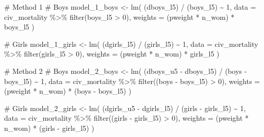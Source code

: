 \documentclass[
  letterpaper,
  DIV=11,
  numbers=noendperiod]{scrartcl}
\newenvironment{Shaded}{\begin{snugshade}}{\end{snugshade}}
\newcommand{\AttributeTok}[1]{\textcolor[rgb]{0.40,0.45,0.13}{#1}}
\newcommand{\CommentTok}[1]{\textcolor[rgb]{0.37,0.37,0.37}{#1}}
\newcommand{\DecValTok}[1]{\textcolor[rgb]{0.68,0.00,0.00}{#1}}
\newcommand{\FunctionTok}[1]{\textcolor[rgb]{0.28,0.35,0.67}{#1}}
\newcommand{\NormalTok}[1]{\textcolor[rgb]{0.00,0.23,0.31}{#1}}
\newcommand{\OtherTok}[1]{\textcolor[rgb]{0.00,0.23,0.31}{#1}}
\newcommand{\SpecialCharTok}[1]{\textcolor[rgb]{0.37,0.37,0.37}{#1}}
\begin{document}
\begin{Shaded}
\begin{Highlighting}[]
\CommentTok{\# Method 1}
\CommentTok{\# Boys}
\NormalTok{model\_1\_boys }\OtherTok{\textless{}{-}} \FunctionTok{lm}\NormalTok{(}
\NormalTok{  (dboys\_l5) }\SpecialCharTok{/}\NormalTok{ (boys\_l5) }\SpecialCharTok{\textasciitilde{}} \DecValTok{1}\NormalTok{, }
  \AttributeTok{data =}\NormalTok{ civ\_mortality }\SpecialCharTok{\%\textgreater{}\%} \FunctionTok{filter}\NormalTok{(boys\_l5 }\SpecialCharTok{\textgreater{}} \DecValTok{0}\NormalTok{), }
  \AttributeTok{weights =}\NormalTok{ (pweight }\SpecialCharTok{*}\NormalTok{ n\_wom) }\SpecialCharTok{*}\NormalTok{ boys\_l5}
\NormalTok{)}

\CommentTok{\# Girls}
\NormalTok{model\_1\_girls }\OtherTok{\textless{}{-}} \FunctionTok{lm}\NormalTok{(}
\NormalTok{  (dgirls\_l5) }\SpecialCharTok{/}\NormalTok{ (girls\_l5) }\SpecialCharTok{\textasciitilde{}} \DecValTok{1}\NormalTok{, }
  \AttributeTok{data =}\NormalTok{ civ\_mortality }\SpecialCharTok{\%\textgreater{}\%} \FunctionTok{filter}\NormalTok{(girls\_l5 }\SpecialCharTok{\textgreater{}} \DecValTok{0}\NormalTok{), }
  \AttributeTok{weights =}\NormalTok{ (pweight }\SpecialCharTok{*}\NormalTok{ n\_wom) }\SpecialCharTok{*}\NormalTok{ girls\_l5}
\NormalTok{)}

\CommentTok{\# Method 2}
\CommentTok{\# Boys}
\NormalTok{model\_2\_boys }\OtherTok{\textless{}{-}} \FunctionTok{lm}\NormalTok{(}
\NormalTok{  (dboys\_u5 }\SpecialCharTok{{-}}\NormalTok{ dboys\_l5) }\SpecialCharTok{/}\NormalTok{ (boys }\SpecialCharTok{{-}}\NormalTok{ boys\_l5) }\SpecialCharTok{\textasciitilde{}} \DecValTok{1}\NormalTok{, }
  \AttributeTok{data =}\NormalTok{ civ\_mortality }\SpecialCharTok{\%\textgreater{}\%} \FunctionTok{filter}\NormalTok{((boys }\SpecialCharTok{{-}}\NormalTok{ boys\_l5) }\SpecialCharTok{\textgreater{}} \DecValTok{0}\NormalTok{), }
  \AttributeTok{weights =}\NormalTok{ (pweight }\SpecialCharTok{*}\NormalTok{ n\_wom) }\SpecialCharTok{*}\NormalTok{ (boys }\SpecialCharTok{{-}}\NormalTok{ boys\_l5)}
\NormalTok{)}

\CommentTok{\# Girls}
\NormalTok{model\_2\_girls }\OtherTok{\textless{}{-}} \FunctionTok{lm}\NormalTok{(}
\NormalTok{  (dgirls\_u5 }\SpecialCharTok{{-}}\NormalTok{ dgirls\_l5) }\SpecialCharTok{/}\NormalTok{ (girls }\SpecialCharTok{{-}}\NormalTok{ girls\_l5) }\SpecialCharTok{\textasciitilde{}} \DecValTok{1}\NormalTok{, }
  \AttributeTok{data =}\NormalTok{ civ\_mortality }\SpecialCharTok{\%\textgreater{}\%} \FunctionTok{filter}\NormalTok{((girls }\SpecialCharTok{{-}}\NormalTok{ girls\_l5) }\SpecialCharTok{\textgreater{}} \DecValTok{0}\NormalTok{), }
  \AttributeTok{weights =}\NormalTok{ (pweight }\SpecialCharTok{*}\NormalTok{ n\_wom) }\SpecialCharTok{*}\NormalTok{ (girls }\SpecialCharTok{{-}}\NormalTok{ girls\_l5)}
\NormalTok{)}


\end{Highlighting}
\end{Shaded}
\end{document}
